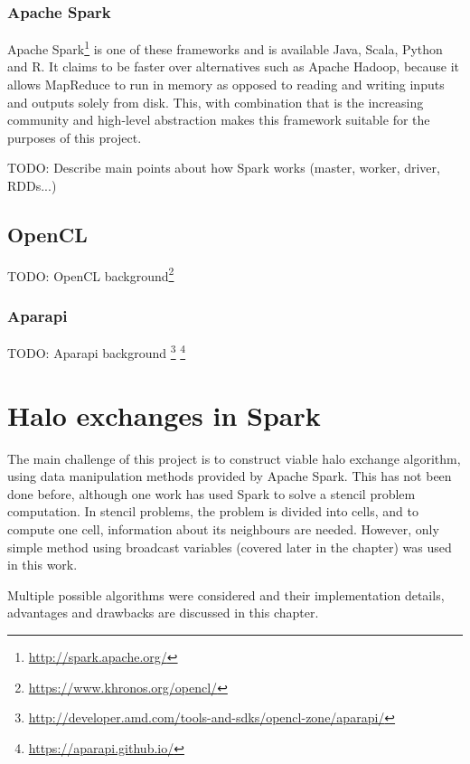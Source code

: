 \documentclass{l4proj}
\begin{document}
\subsection{Apache Spark}

Apache Spark\footnote{\url{http://spark.apache.org/}} is one of these frameworks and is available Java, Scala, Python and R. It claims
to be faster over alternatives such as Apache Hadoop, because it allows MapReduce to run in
memory as opposed to reading and writing inputs and outputs solely from disk. This, with combination
that is the increasing community and high-level abstraction makes this framework suitable for the purposes
of this project.  

TODO: Describe main points about how Spark works (master, worker, driver, RDDs...)

\section{OpenCL}

TODO: OpenCL background\footnote{\url{https://www.khronos.org/opencl/}}
\subsection{Aparapi}
TODO: Aparapi background
\footnote{\url{http://developer.amd.com/tools-and-sdks/opencl-zone/aparapi/}}
\footnote{\url{https://aparapi.github.io/}}

\chapter{Halo exchanges in Spark}
\label{chap:halos}

The main challenge of this project is to construct viable halo exchange algorithm, using 
data manipulation methods provided by Apache Spark. This has not been done before, although
one work\cite{seismic_spark} has used Spark to solve a stencil problem computation. In stencil
problems, the problem is divided into cells, and to compute one cell, information about its
neighbours are needed. However, only simple method using broadcast variables (covered later in the chapter)
was used in this work.

Multiple possible algorithms were considered and their implementation details, advantages
and drawbacks are discussed in this chapter.
\end{document}
